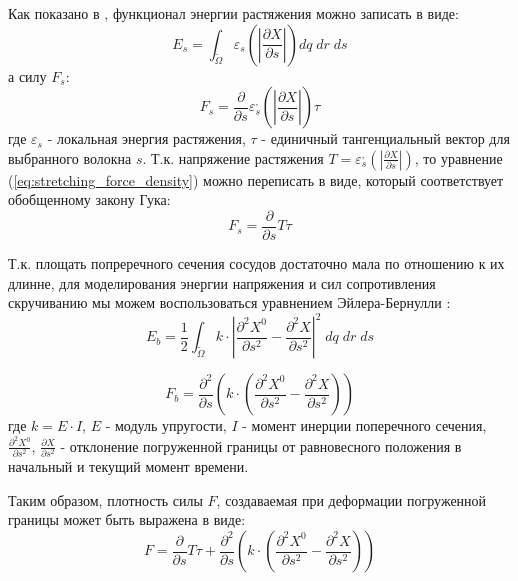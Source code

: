 Как показано в \cite{peskin2002immersed}, \cite{griffith2009simulating} функционал энергии растяжения можно записать в виде:
\begin{equation}
\label{eq:stretching_energy_functional}
E_s = \int_{\tilde{\Omega}} \varepsilon_s \left(\left| \frac{\partial X}{\partial s} \right| \right) dq \; dr \; ds
\end{equation}
а силу $F_s$:
\begin{equation}
\label{eq:stretching_force_density}
F_s = \frac{\partial}{\partial s} \varepsilon_s^{,} \left( \left| \frac{\partial X}{\partial s} \right| \right) \tau
\end{equation}
где $\varepsilon_s$ - локальная энергия растяжения, $\tau$ - единичный тангенциальный вектор для выбранного волокна $s$.
Т.к. напряжение растяжения $T = \varepsilon_s^{,} \left( \left| \frac{\partial X}{\partial s} \right| \right)$, то уравнение (\ref{eq:stretching_force_density})
можно переписать в виде, который соответствует обобщенному закону Гука:
\begin{equation}
\label{eq:stretching_force_density_simplified}
F_s = \frac{\partial}{\partial s} T \tau
\end{equation}

Т.к. площать попреречного сечения сосудов достаточно мала по отношению к их длинне, для моделирования энергии напряжения и 
сил сопротивления скручиванию мы можем воспользоваться уравнением Эйлера-Бернулли \cite{gere1997mechanics}:
\begin{equation}
    E_b = \frac{1}{2} \int_{\tilde{\Omega}} k \cdot \left| \frac{\partial^2 X^0}{\partial s^2} - \frac{\partial^2 X}{\partial s^2} \right|^2 \; dq\; dr\; ds
\end{equation}

\begin{equation}
    F_b = \frac{\partial^2}{\partial s} \left( k \cdot \left(\frac{\partial^2 X^0}{\partial s^2} - \frac{\partial^2 X}{\partial s^2} \right) \right)
\end{equation}
где $k = E \cdot I$, $E$ - модуль упругости, $I$ - момент инерции поперечного сечения, $\frac{\partial^2 X^0}{\partial s^2}$, $\frac{\partial X}{\partial s^2}$ -
отклонение погруженной границы от равновесного положения в начальный и текущий момент времени.

Таким образом, плотность силы $F$, создаваемая при деформации погруженной границы может быть выражена в виде:
\begin{equation}
    F = \frac{\partial}{\partial s} T \tau + \frac{\partial^2}{\partial s} \left( k \cdot \left(\frac{\partial^2 X^0}{\partial s^2} - \frac{\partial^2 X}{\partial s^2} \right) \right)
\end{equation}

